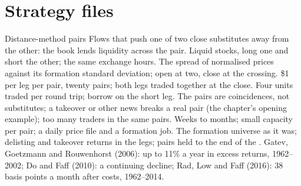 \begin{omfigure}

\label{fig:s1:pairs-and-baskets:books}
\end{omfigure}

\section{Strategy files}

\begin{strategyfile}{Distance-method pairs}\label{strat:s1:pairs-and-baskets:distance}
 Flows that push one of two close substitutes away from the other: the book lends liquidity across the pair.
 Liquid stocks, long one and short the other; the same exchange hours.
 The spread of normalised prices against its formation standard deviation; open at two, close at the crossing.
 \$1 per leg per pair, twenty pairs; both legs traded together at the close.
 Four units traded per round trip; borrow on the short leg.
 The pairs are coincidences, not substitutes; a takeover or other news breaks a real pair (the chapter's opening example); too many traders
in the same pairs.
 Weeks to months; small capacity per pair; a daily price file and a formation job.
 The formation universe as it was; delisting and takeover returns in the legs; pairs held to the end of the .
 Gatev, Goetzmann and Rouwenhorst (2006): up to 11\% a year in excess returns, 1962--2002; Do and Faff (2010): a continuing decline; Rad,
Low and Faff (2016): 38 basis points a month after costs, 1962--2014.
\end{strategyfile}

